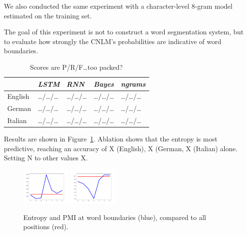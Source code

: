 We also conducted the same experiment with a character-level 8-gram model estimated on the training set.

The goal of this experiment is not to construct a word segmentation system, but to evaluate how strongly the CNLM's probabilities are indicative of word boundaries.

\begin{table}[t]
  \begin{center}
    \begin{tabular}{l|l|l|l|l}
      \multicolumn{1}{c}{}&\emph{LSTM}&\emph{RNN}&\emph{Bayes}&\emph{ngrams}\\
      \hline
      English &\ldots{}/\ldots{}/\ldots & \ldots{}/\ldots{}/\ldots & \ldots{}/\ldots{}/\ldots &\ldots{}/\ldots{}/\ldots\\
      German &\ldots{}/\ldots{}/\ldots & \ldots{}/\ldots{}/\ldots & \ldots{}/\ldots{}/\ldots &\ldots{}/\ldots{}/\ldots\\
      Italian &\ldots{}/\ldots{}/\ldots & \ldots{}/\ldots{}/\ldots & \ldots{}/\ldots{}/\ldots &\ldots{}/\ldots{}/\ldots\\
    \end{tabular}
  \end{center}
  \caption{\label{tab:segmentation-results} Scores are P/R/F\ldots too packed?}
\end{table}

Results are shown in Figure~\ref{tab:segmentation-results}.
Ablation shows that the entropy is most predictive, reaching an accuracy of X (English), X (German, X (Italian) alone.
Setting N to other values X.

\begin{figure}
\includegraphics[width=0.22\textwidth]{figures/segmentation-profile-flattened-entropies-german.png}
\includegraphics[width=0.22\textwidth]{figures/segmentation-profile-flattened-pmis-german.png}
	\caption{Entropy and PMI at word boundaries (blue), compared to all positions (red). }\label{fig:syntax-depth}
\end{figure}

